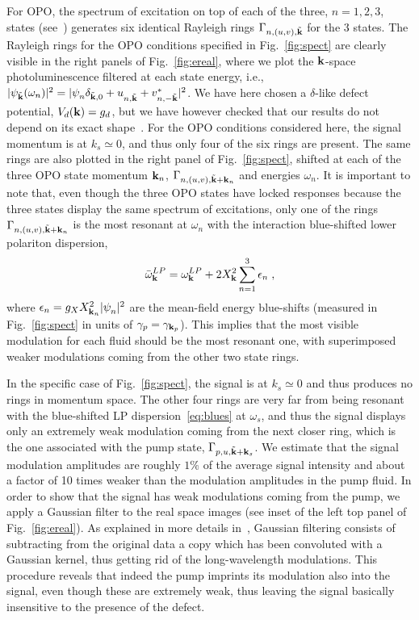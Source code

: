 For OPO, the spectrum of excitation on top of each of the three,
$n=1,2,3$, states (see~\cite{SM}) generates six identical Rayleigh
rings $\Gamma_{n,(u,v), \tilde{\mathbf{k}}}$ for the 3 states.
%
The Rayleigh rings for the OPO conditions specified in
Fig.~\ref{fig:spect} are clearly visible in the right panels of
Fig.~\ref{fig:ereal}, where we plot the $\mathbf{k}$-space
photoluminescence filtered at each state energy, i.e.,
$|\psi_{\tilde{\mathbf{k}}} (\omega_n)|^2= |\psi_{n}^{}
\delta_{\tilde{\mathbf{k}},0} + u_{n,\tilde{\mathbf{k}}}^{} +
v^*_{n,-\tilde{\mathbf{k}}}|^2$.
%
We have here chosen a $\delta$-like defect potential, $V_d(\mathbf{k}) =
g_d$, but we have however checked that our results do not depend on
its exact shape~\cite{SM}.
%
For the OPO conditions considered here, the signal momentum is at $k_s
\simeq 0$, and thus only four of the six rings are present. The same
rings are also plotted in the right panel of Fig.~\ref{fig:spect},
shifted at each of the three OPO state momentum $\mathbf{k}_n$,
$\Gamma_{n,(u,v), \tilde{\mathbf{k}}+\mathbf{k}_n}$ and energies
$\omega_n$.
%
It is important to note that, even though the three OPO states have
locked responses because the three states display the same spectrum of
excitations, only one of the rings $\Gamma_{n,(u,v),
  \tilde{\mathbf{k}}+\mathbf{k}_n}$ is the most resonant at $\omega_n$
with the interaction blue-shifted lower polariton dispersion,
%
\begin{equation}
  \bar{\omega}_{\mathbf{k}}^{LP} = \omega_{\mathbf{k}}^{LP} + 2 
  X_{\mathbf{k}}^2 \sum_{n=1}^3  \epsilon_n\; ,
\label{eq:blues}
\end{equation}
%
where $\epsilon_n = g_X X_{\mathbf{k}_n}^2 |\psi_n^{}|^2$ are the
mean-field energy blue-shifts (measured in Fig.~\ref{fig:spect} in
units of $\gamma_p = \gamma_{\mathbf{k}_p}$).  This implies that the
most visible modulation for each fluid should be the most resonant
one, with superimposed weaker modulations coming from the other two
state rings.

In the specific case of Fig.~\ref{fig:spect}, the signal is at $k_s
\simeq 0$ and thus produces no rings in momentum space. The other four
rings are very far from being resonant with the blue-shifted LP
dispersion~\eqref{eq:blues} at $\omega_s$, and thus the signal
displays only an extremely weak modulation coming from the next
closer ring, which is the one associated with the pump state,
$\Gamma_{p,u, \tilde{\mathbf{k}}+\mathbf{k}_s}$.
%
We estimate that the signal modulation amplitudes are roughly $1\%$ of
the average signal intensity and about a factor of 10 times weaker
than the modulation amplitudes in the pump fluid.
%
In order to show that the signal has weak modulations coming from
the pump, we apply a Gaussian filter to the real space images (see
inset of the left top panel of Fig.~\ref{fig:ereal}).
%
As explained in more details in~\cite{SM}, Gaussian filtering consists
of subtracting from the original data a copy which has been
convoluted with a Gaussian kernel, thus getting rid of the
long-wavelength modulations.
%
This procedure reveals that indeed the pump imprints its modulation
also into the signal, even though these are extremely weak, thus
leaving the signal basically insensitive to the presence of the
defect.

